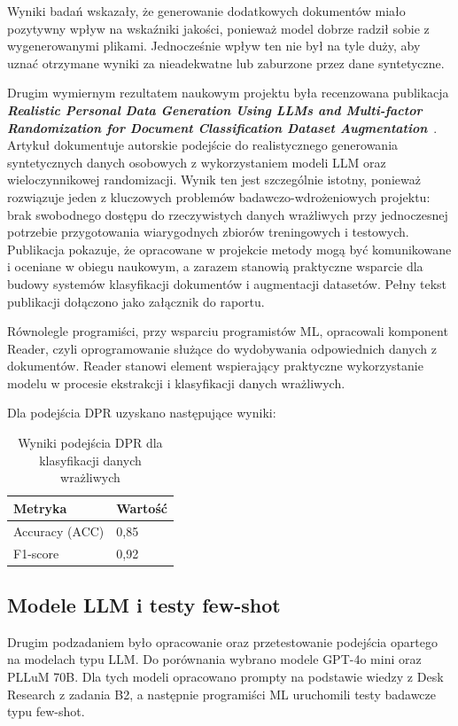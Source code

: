 \documentclass[12pt,a4paper]{report}
\begin{document}
Wyniki badań wskazały, że generowanie dodatkowych dokumentów miało pozytywny wpływ na wskaźniki jakości, ponieważ model dobrze radził sobie z wygenerowanymi plikami. Jednocześnie wpływ ten nie był na tyle duży, aby uznać otrzymane wyniki za nieadekwatne lub zaburzone przez dane syntetyczne.

Drugim wymiernym rezultatem naukowym projektu była recenzowana publikacja \textit{\textbf{Realistic Personal Data Generation Using LLMs and Multi-factor Randomization for Document Classification Dataset Augmentation}}~\cite{legumina2025realisticpersonaldata}. Artykuł dokumentuje autorskie podejście do realistycznego generowania syntetycznych danych osobowych z wykorzystaniem modeli LLM oraz wieloczynnikowej randomizacji. Wynik ten jest szczególnie istotny, ponieważ rozwiązuje jeden z kluczowych problemów badawczo-wdrożeniowych projektu: brak swobodnego dostępu do rzeczywistych danych wrażliwych przy jednoczesnej potrzebie przygotowania wiarygodnych zbiorów treningowych i testowych. Publikacja pokazuje, że opracowane w projekcie metody mogą być komunikowane i oceniane w obiegu naukowym, a zarazem stanowią praktyczne wsparcie dla budowy systemów klasyfikacji dokumentów i augmentacji datasetów. Pełny tekst publikacji dołączono jako załącznik do raportu.

Równolegle programiści, przy wsparciu programistów ML, opracowali komponent Reader, czyli oprogramowanie służące do wydobywania odpowiednich danych z dokumentów. Reader stanowi element wspierający praktyczne wykorzystanie modelu w procesie ekstrakcji i klasyfikacji danych wrażliwych.

Dla podejścia DPR uzyskano następujące wyniki:

\begin{table}[h]
    \centering
    \caption{Wyniki podejścia DPR dla klasyfikacji danych wrażliwych}
    \begin{tabular}{l l}
        \toprule
        Metryka & Wartość \\
        \midrule
        Accuracy (ACC) & 0{,}85 \\
        F1-score & 0{,}92 \\
        \bottomrule
    \end{tabular}
\end{table}

\subsection{Modele LLM i testy few-shot}
Drugim podzadaniem było opracowanie oraz przetestowanie podejścia opartego na modelach typu LLM. Do porównania wybrano modele GPT-4o mini oraz PLLuM 70B. Dla tych modeli opracowano prompty na podstawie wiedzy z Desk Research z zadania B2, a następnie programiści ML uruchomili testy badawcze typu few-shot.
\end{document}
